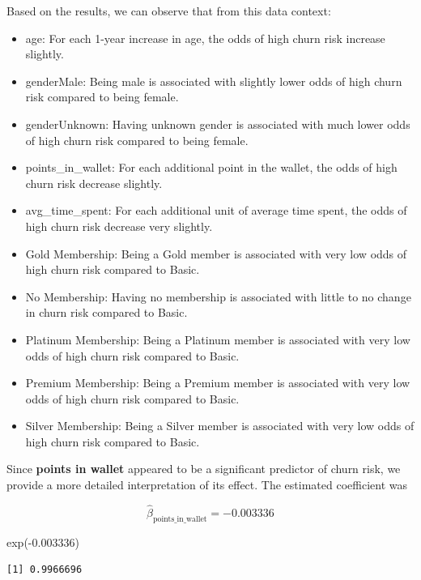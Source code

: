 \documentclass[
  letterpaper,
  DIV=11,
  numbers=noendperiod]{scrartcl}
\newenvironment{Shaded}{\begin{snugshade}}{\end{snugshade}}
\newcommand{\FloatTok}[1]{\textcolor[rgb]{0.68,0.00,0.00}{#1}}
\newcommand{\FunctionTok}[1]{\textcolor[rgb]{0.28,0.35,0.67}{#1}}
\newcommand{\NormalTok}[1]{\textcolor[rgb]{0.00,0.23,0.31}{#1}}
\newcommand{\SpecialCharTok}[1]{\textcolor[rgb]{0.37,0.37,0.37}{#1}}
\begin{document}
Based on the results, we can observe that from this data context:

\begin{itemize}
\item
  age: For each 1-year increase in age, the odds of high churn risk
  increase slightly.
\item
  genderMale: Being male is associated with slightly lower odds of high
  churn risk compared to being female.
\item
  genderUnknown: Having unknown gender is associated with much lower
  odds of high churn risk compared to being female.
\item
  points\_in\_wallet: For each additional point in the wallet, the odds
  of high churn risk decrease slightly.
\item
  avg\_time\_spent: For each additional unit of average time spent, the
  odds of high churn risk decrease very slightly.
\item
  Gold Membership: Being a Gold member is associated with very low odds
  of high churn risk compared to Basic.
\item
  No Membership: Having no membership is associated with little to no
  change in churn risk compared to Basic.
\item
  Platinum Membership: Being a Platinum member is associated with very
  low odds of high churn risk compared to Basic.
\item
  Premium Membership: Being a Premium member is associated with very low
  odds of high churn risk compared to Basic.
\item
  Silver Membership: Being a Silver member is associated with very low
  odds of high churn risk compared to Basic.
\end{itemize}

Since \textbf{points in wallet} appeared to be a significant predictor
of churn risk, we provide a more detailed interpretation of its effect.
The estimated coefficient was

\[
\hat{\beta}_{\mathrm{points\_in\_wallet}} = -0.003336
\]

\begin{Shaded}
\begin{Highlighting}[]
\FunctionTok{exp}\NormalTok{(}\SpecialCharTok{{-}}\FloatTok{0.003336}\NormalTok{)}
\end{Highlighting}
\end{Shaded}

\begin{verbatim}
[1] 0.9966696
\end{verbatim}
\end{document}
